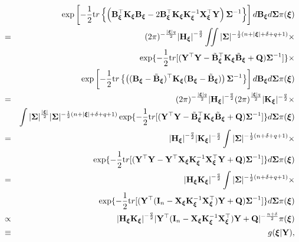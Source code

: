 \documentclass[]{book}
\begin{document}
\begin{eqnarray*}
&&\exp\left[-\frac{1}{2}{\text tr}\left\{\left({\bf B}_{{\boldsymbol \xi}}^{{\top}}{\bf K}_{{\boldsymbol \xi}}{\bf B}_{{\boldsymbol \xi}}-2{\bf B}_{{\boldsymbol \xi}}^{{\top}}{\bf K}_{{\boldsymbol \xi}}{\bf K}_{{\boldsymbol \xi}}^{-1}{\bf X}_{{\boldsymbol \xi}}^{{\top}}{\bf Y}\right){\boldsymbol \Sigma}^{-1}\right\}\right]d{\bf B}_{{\boldsymbol \xi}} d{\boldsymbol \Sigma}\pi({\boldsymbol \xi})\\
&=& (2\pi)^{-\frac{|{\boldsymbol \xi}| q}{2}}{|{\bf H}_{{\boldsymbol \xi}}|}^{-\frac{q}{2}}\iint |{\boldsymbol \Sigma}|^{-\frac{1}{2}(n+|{\boldsymbol \xi}|+\delta+q+1)}\times\\
&&\exp\{-\frac{1}{2}{\text tr}[({\bf Y}^{{\top}}{\bf Y}-\tilde{{\bf B}}_{{\boldsymbol \xi}}^{{\top}}{\bf K}_{{\boldsymbol \xi}}\tilde{{\bf B}}_{{\boldsymbol \xi}} +{\bf Q}){\boldsymbol \Sigma}^{-1}]\}\times \\
&&\exp\left[-\frac{1}{2}{\text tr}\left\{\left( ({\bf B}_{{\boldsymbol \xi}} - \tilde{{\bf B}}_{{\boldsymbol \xi}})^{{\top}} {\bf K}_{{\boldsymbol \xi}}({\bf B}_{{\boldsymbol \xi}} - \tilde{{\bf B}}_{{\boldsymbol \xi}})\right){\boldsymbol \Sigma}^{-1}\right\}\right]d{\bf B}_{{\boldsymbol \xi}} d{\boldsymbol \Sigma}\pi({\boldsymbol \xi})\\
&=& (2\pi)^{-\frac{|{\boldsymbol \xi}| q}{2}}{|{\bf H}_{{\boldsymbol \xi}}|}^{-\frac{q}{2}} (2\pi)^{\frac{|{\boldsymbol \xi}| q}{2}} |{\bf K}_{{\boldsymbol \xi}}|^{-\frac{q}{2}} \times \\
&&\int |{\boldsymbol \Sigma}|^{\frac{|{\boldsymbol \xi}|}{2}} |{\boldsymbol \Sigma}|^{-\frac{1}{2}(n+|{\boldsymbol \xi}|+\delta+q+1)}\exp\{-\frac{1}{2}{\text tr}[({\bf Y}^{{\top}}{\bf Y}-\tilde{{\bf B}}_{{\boldsymbol \xi}}^{{\top}}{\bf K}_{{\boldsymbol \xi}}\tilde{{\bf B}}_{{\boldsymbol \xi}} +{\bf Q}){\boldsymbol \Sigma}^{-1}]\}  d{\boldsymbol \Sigma}\pi({\boldsymbol \xi})\\
&=& {|{\bf H}_{{\boldsymbol \xi}}|}^{-\frac{q}{2}} |{\bf K}_{{\boldsymbol \xi}}|^{-\frac{q}{2}}
\int |{\boldsymbol \Sigma}|^{-\frac{1}{2}(n+\delta+q+1)}\times\\
&&\exp\{-\frac{1}{2}{\text tr}[({\bf Y}^{{\top}}{\bf Y}-{\bf Y}^{{\top}}{\bf X}_{{\boldsymbol \xi}}{\bf K}_{{\boldsymbol \xi}}^{-1}{\bf X}_{{\boldsymbol \xi}}^{{\top}}{\bf Y}+{\bf Q}){\boldsymbol \Sigma}^{-1}]\}  d{\boldsymbol \Sigma}\pi({\boldsymbol \xi})\\
&=& {|{\bf H}_{{\boldsymbol \xi}}{\bf K}_{{\boldsymbol \xi}}|}^{-\frac{q}{2}}
\int |{\boldsymbol \Sigma}|^{-\frac{1}{2}(n+\delta+q+1)}\times\\
&&\exp\{-\frac{1}{2}{\text tr}[({\bf Y}^{{\top}}({\bf I}_n - {\bf X}_{{\boldsymbol \xi}}{\bf K}_{{\boldsymbol \xi}}^{-1}{\bf X}_{{\boldsymbol \xi}}^{{\top}}){\bf Y}+{\bf Q}){\boldsymbol \Sigma}^{-1}]\}  d{\boldsymbol \Sigma}\pi({\boldsymbol \xi})\\
&\propto& {|{\bf H}_{{\boldsymbol \xi}}{\bf K}_{{\boldsymbol \xi}}|}^{-\frac{q}{2}}|{\bf Y}^{{\top}}({\bf I}_n - {\bf X}_{{\boldsymbol \xi}}{\bf K}_{{\boldsymbol \xi}}^{-1}{\bf X}_{{\boldsymbol \xi}}^{{\top}}){\bf Y}+{\bf Q}|^{-\frac{n+\delta}{2}} \pi({\boldsymbol \xi})\\
&\equiv&g({\boldsymbol \xi}|{\bf Y}),
\label{eq:1}
\end{eqnarray*}
\end{document}
